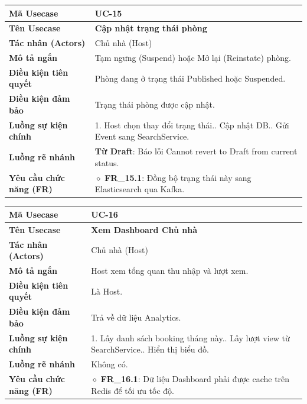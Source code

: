 \begin{table}[H]
\renewcommand{\arraystretch}{1.3}
\centering
\begin{tabularx}{\textwidth}{|p{4.5cm}|X|}
\hline
\cellcolor{gray!15}\bfseries Mã Usecase & \textbf{UC-15} \\ \hline
\cellcolor{gray!15}\bfseries Tên Usecase & \textbf{Cập nhật trạng thái phòng} \\ \hline
\cellcolor{gray!15}\bfseries Tác nhân (Actors) & Chủ nhà (Host) \\ \hline
\cellcolor{gray!15}\bfseries Mô tả ngắn & Tạm ngưng (Suspend) hoặc Mở lại (Reinstate) phòng. \\ \hline
\cellcolor{gray!15}\bfseries Điều kiện tiên quyết & Phòng đang ở trạng thái Published hoặc Suspended. \\ \hline
\cellcolor{gray!15}\bfseries Điều kiện đảm bảo & Trạng thái phòng được cập nhật. \\ \hline
\cellcolor{gray!15}\bfseries Luồng sự kiện chính & 1. Host chọn thay đổi trạng thái.\newline 2. Cập nhật DB.\newline 3. Gửi Event sang SearchService. \\ \hline
\cellcolor{gray!15}\bfseries Luồng rẽ nhánh & \textbf{Từ Draft}: Báo lỗi Cannot revert to Draft from current status. \\ \hline
\cellcolor{gray!15}\bfseries Yêu cầu chức năng (FR) & $\diamond$ \textbf{FR\_15.1}: Đồng bộ trạng thái này sang Elasticsearch qua Kafka. \\ \hline
\end{tabularx}
\end{table}

\begin{table}[H]
\renewcommand{\arraystretch}{1.3}
\centering
\begin{tabularx}{\textwidth}{|p{4.5cm}|X|}
\hline
\cellcolor{gray!15}\bfseries Mã Usecase & \textbf{UC-16} \\ \hline
\cellcolor{gray!15}\bfseries Tên Usecase & \textbf{Xem Dashboard Chủ nhà} \\ \hline
\cellcolor{gray!15}\bfseries Tác nhân (Actors) & Chủ nhà (Host) \\ \hline
\cellcolor{gray!15}\bfseries Mô tả ngắn & Host xem tổng quan thu nhập và lượt xem. \\ \hline
\cellcolor{gray!15}\bfseries Điều kiện tiên quyết & Là Host. \\ \hline
\cellcolor{gray!15}\bfseries Điều kiện đảm bảo & Trả về dữ liệu Analytics. \\ \hline
\cellcolor{gray!15}\bfseries Luồng sự kiện chính & 1. Lấy danh sách booking tháng này.\newline 2. Lấy lượt view từ SearchService.\newline 3. Hiển thị biểu đồ. \\ \hline
\cellcolor{gray!15}\bfseries Luồng rẽ nhánh & Không có. \\ \hline
\cellcolor{gray!15}\bfseries Yêu cầu chức năng (FR) & $\diamond$ \textbf{FR\_16.1}: Dữ liệu Dashboard phải được cache trên Redis để tối ưu tốc độ. \\ \hline
\end{tabularx}
\end{table}

